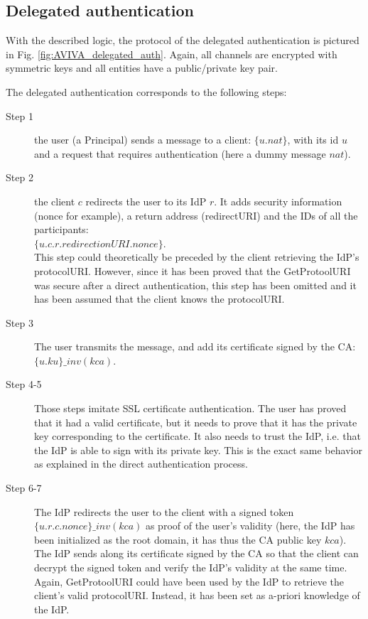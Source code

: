 \subsection{Delegated authentication}
With the described logic, the protocol of the delegated authentication is pictured in Fig. \ref{fig:AVIVA_delegated_auth}. Again, all channels are encrypted with symmetric keys and all entities have a public/private key pair.

The delegated authentication corresponds to the following steps:
\begin{description}
	\item[Step 1] the user (a Principal) sends a message to a client: $\{u.nat\}$, with its id $u$ and a  request that requires authentication (here a dummy message $nat$).
	\item[Step 2] the client $c$ redirects the user to its IdP $r$. It adds security information (nonce for example), a return address (redirectURI) and the IDs of all the participants:\\ $\{u.c.r.redirectionURI.nonce\} $. 
	\\This step could theoretically be preceded by the client retrieving the IdP's protocolURI. However, since it has been proved that the GetProtoolURI was secure after a direct authentication, this step has been omitted and it has been assumed that the client knows the protocolURI.
	\item[Step 3] The user transmits the message, and add its certificate signed by the CA: $ \{u.ku\}\_inv(kca) $.
	\item[Step 4-5] Those steps imitate SSL certificate authentication. The user has proved that it had a valid certificate, but it needs to prove that it has the private key corresponding to the certificate. It also needs to trust the IdP, i.e. that the IdP is able to sign with its private key. This is the exact same behavior as explained in the direct authentication process.
	\item[Step 6-7] The IdP redirects the user to the client with a signed token $ \{u.r.c.nonce\}\_inv(kca) $ as proof of the user's validity (here, the IdP has been initialized as the root domain, it has thus the CA public key $ kca $). The IdP sends along its certificate signed by the CA so that the client can decrypt the signed token and verify the IdP's validity at the same time. \\
	Again, GetProtoolURI could have been used by the IdP to retrieve the client's valid protocolURI. Instead, it has been set as a-priori knowledge of the IdP.
\end{description}

